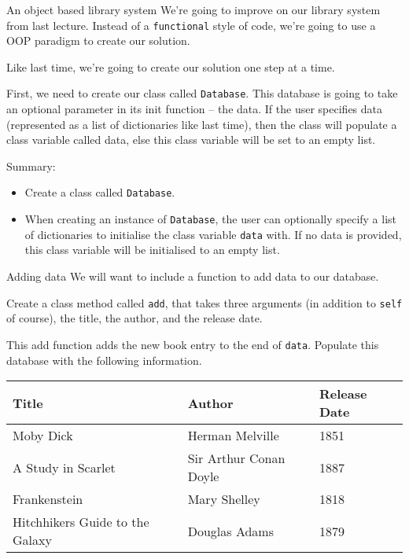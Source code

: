 \documentclass[10pt]{beamer}
\begin{document}
\begin{frame}[label={sec:org517c442},fragile]{An object based library system}
 We're going to improve on our library system from last lecture. Instead of a
\texttt{functional} style of code, we're going to use a OOP paradigm to create our solution.

Like last time, we're going to create our solution one step at a time.

First, we need to create our class called \texttt{Database}. This database is going to take an
optional parameter in its init function -- the data. If the user specifies data
(represented as a list of dictionaries like last time), then the class will populate
a class variable called data, else this class variable will be set to an empty list.

Summary:
\begin{itemize}
\item Create a class called \texttt{Database}.
\item When creating an instance of \texttt{Database}, the user can optionally specify a list of
dictionaries to initialise the class variable \texttt{data} with. If no data is provided,
this class variable will be initialised to an empty list.
\end{itemize}
\end{frame}

\begin{frame}[label={sec:org3234d7f},fragile]{Adding data}
 We will want to include a function to add data to our database.

Create a class method called \texttt{add}, that takes three arguments (in addition to \texttt{self} of
course), the title, the author, and the release date.

This add function adds the new book entry to the end of \texttt{data}. Populate this database
with the following information.

\begin{center}
\begin{tabularx}{\textwidth}{XXX}
Title & Author & Release Date\\
\hline
Moby Dick & Herman Melville & 1851\\
A Study in Scarlet & Sir Arthur Conan Doyle & 1887\\
Frankenstein & Mary Shelley & 1818\\
Hitchhikers Guide to the Galaxy & Douglas Adams & 1879\\
\end{tabularx}
\end{center}
\end{frame}
\end{document}
